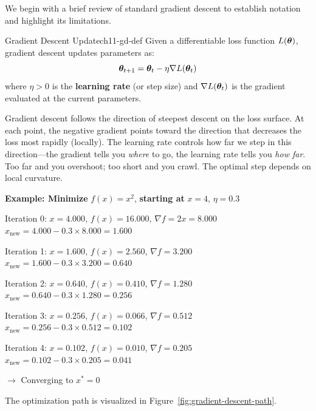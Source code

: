 \documentclass[../../main.tex]{subfiles}
\begin{document}
We begin with a brief review of standard gradient descent to establish notation and highlight its limitations.

\begin{definition}{Gradient Descent Update}{ch11-gd-def}
Given a differentiable loss function $L(\boldsymbol{\theta})$, gradient descent updates parameters as:
\[
    \boldsymbol{\theta}_{t+1} = \boldsymbol{\theta}_t - \eta \nabla L(\boldsymbol{\theta}_t)
\]
where $\eta > 0$ is the \textbf{learning rate} (or step size) and $\nabla L(\boldsymbol{\theta}_t)$ is the gradient evaluated at the current parameters.
\end{definition}

\begin{intuition}
Gradient descent follows the direction of steepest descent on the loss surface. At each point, the negative gradient points toward the direction that decreases the loss most rapidly (locally). The learning rate controls how far we step in this direction---the gradient tells you \emph{where} to go, the learning rate tells you \emph{how far}. Too far and you overshoot; too short and you crawl. The optimal step depends on local curvature.
\end{intuition}

\begin{algorithmtrace}
\textbf{Example: Minimize} $f(x) = x^2$, \textbf{starting at} $x = 4$, $\eta = 0.3$

Iteration 0: $x = 4.000$, $f(x) = 16.000$, $\nabla f = 2x = 8.000$
             $x_{\text{new}} = 4.000 - 0.3 \times 8.000 = 1.600$

Iteration 1: $x = 1.600$, $f(x) = 2.560$, $\nabla f = 3.200$
             $x_{\text{new}} = 1.600 - 0.3 \times 3.200 = 0.640$

Iteration 2: $x = 0.640$, $f(x) = 0.410$, $\nabla f = 1.280$
             $x_{\text{new}} = 0.640 - 0.3 \times 1.280 = 0.256$

Iteration 3: $x = 0.256$, $f(x) = 0.066$, $\nabla f = 0.512$
             $x_{\text{new}} = 0.256 - 0.3 \times 0.512 = 0.102$

Iteration 4: $x = 0.102$, $f(x) = 0.010$, $\nabla f = 0.205$
             $x_{\text{new}} = 0.102 - 0.3 \times 0.205 = 0.041$

$\rightarrow$ Converging to $x^* = 0$ \checkmark
\end{algorithmtrace}

The optimization path is visualized in Figure~\ref{fig:gradient-descent-path}.
\end{document}
